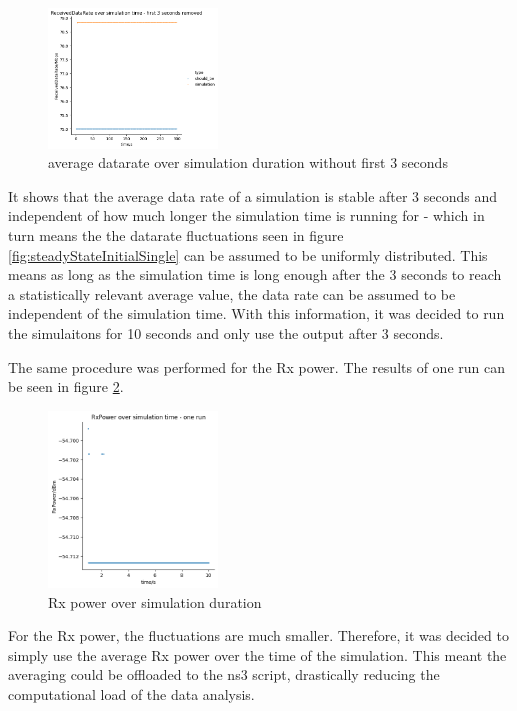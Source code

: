 \begin{figure}[ht]
    \centering
    \includegraphics[width=0.4\textwidth]{../DataAnalysis/results/dr_over_time_without_first_3_seconds.png}
    \caption{average datarate over simulation duration without first 3 seconds}
    \label{fig:steadyStateFinal}
\end{figure}

It shows that the average data rate of a simulation is stable after 3 seconds and independent of how much longer the simulation 
time is running for - which in turn means the the datarate fluctuations seen in figure \ref{fig:steadyStateInitialSingle} can be assumed to be 
uniformly distributed. This means as long as the simulation time is long enough after the 3 seconds to reach a statistically relevant 
average value, the data rate can be assumed to be independent of the simulation time. With this information, it was 
decided to run the simulaitons for 10 seconds and only use the output after 3 seconds.

The same procedure was performed for the Rx power. The results of one run can be seen in figure \ref{fig:rxPowerSteadyState}.
\begin{figure}[ht]
    \centering
    \includegraphics[width=0.4\textwidth]{../DataAnalysis/results/results_rx_pwr_over_time.png}
    \caption{Rx power over simulation duration}
    \label{fig:rxPowerSteadyState}
\end{figure}

For the Rx power, the fluctuations are much smaller. Therefore, it was decided to simply use the average Rx power over the
time of the simulation. This meant the averaging could be offloaded to the ns3 script, drastically 
reducing the computational load of the data analysis.

